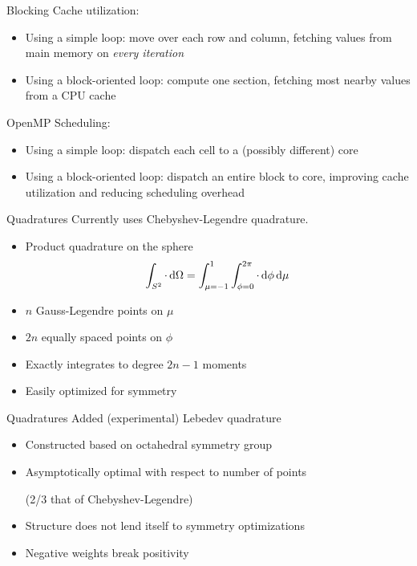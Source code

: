 \documentclass{beamer}
\begin{document}
    \begin{frame}{Blocking}
        Cache utilization:
        \begin{itemize}
            \item Using a simple loop: move over each row and column, fetching values from main memory on \emph{every iteration}
            \item Using a block-oriented loop: compute one section, fetching most nearby values from a CPU cache
        \end{itemize}

        \vfill

        OpenMP Scheduling:
        \begin{itemize}
            \item Using a simple loop: dispatch each cell to a (possibly different) core
            \item Using a block-oriented loop: dispatch an entire block to core, improving cache utilization and reducing scheduling overhead
        \end{itemize}
    \end{frame}

    \begin{frame}{Quadratures}
        Currently uses Chebyshev-Legendre quadrature.
        \begin{itemize}
            \item Product quadrature on the sphere \[\int_{S^2} \cdot \dif \Omega = \int_{\mu=-1}^1 \int_{\phi=0}^{2\pi} \cdot \dif \phi \dif \mu\]
            \item $n$ Gauss-Legendre points on $\mu$
            \item $2n$ equally spaced points on $\phi$
            \item Exactly integrates to degree $2n - 1$ moments
            \item Easily optimized for symmetry
        \end{itemize}
    \end{frame}

    \begin{frame}{Quadratures}
        Added (experimental) Lebedev quadrature
        \begin{itemize}
            \item Constructed based on octahedral symmetry group
            \item Asymptotically optimal with respect to number of points

            (2/3 that of Chebyshev-Legendre)
            \item Structure does not lend itself to symmetry optimizations
            \item \alert{Negative weights break positivity}
        \end{itemize}
    \end{frame}
\end{document}

